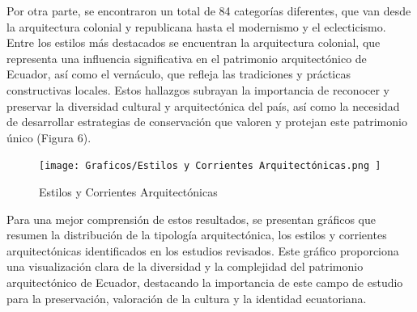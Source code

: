 \documentclass[journal,article,submit,pdftex,moreauthors]{Definitions/mdpi}
\begin{document}
\par %
Por otra parte, se encontraron un total de 84 categorías diferentes, que van desde la arquitectura colonial y republicana hasta el modernismo y el eclecticismo. Entre los estilos más destacados se encuentran la arquitectura colonial, que representa una influencia significativa en el patrimonio arquitectónico de Ecuador, así como el vernáculo, que refleja las tradiciones y prácticas constructivas locales. Estos hallazgos subrayan la importancia de reconocer y preservar la diversidad cultural y arquitectónica del país, así como la necesidad de desarrollar estrategias de conservación que valoren y protejan este patrimonio único (Figura 6).
 \par %
  \begin{figure} [h!]
    \centering
    \texttt{[image: Graficos/Estilos y Corrientes Arquitectónicas.png ]}
    \caption{Estilos y Corrientes Arquitectónicas}
    \label{fig:grafico}
\end{figure}
\par %
 
Para una mejor comprensión de estos resultados, se presentan gráficos que resumen la distribución de la tipología arquitectónica, los estilos y corrientes arquitectónicas identificados en los estudios revisados. Este gráfico proporciona una visualización clara de la diversidad y la complejidad del patrimonio arquitectónico de Ecuador, destacando la importancia de este campo de estudio para la preservación, valoración de la cultura y la identidad ecuatoriana.\par %
 
\end{document}
